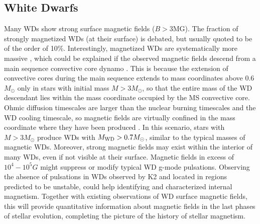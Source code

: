 {\color{red} \subsection{White Dwarfs}}
Many WDs show strong surface magnetic fields ($B>$3MG). The fraction of strongly magnetized WDs (at their surface) is debated, but usually quoted to be of the order of 10\%. Interestingly, magnetized WDs are systematically more massive \cite{Ferrario_2015}, which could be explained if the observed magnetic fields descend from a main sequence convective core dynamo \cite{Cantiello_2016}. This is because the extension of convective cores during the main sequence extends to mass coordinates above 0.6$M_\odot$ only in stars with initial mass $M>3M_\odot$, so that the entire mass of the WD descendant lies within the mass coordinate occupied by the MS convective core. Ohmic diffusion timescales are larger than the nuclear burning timescales and the WD cooling timescale, so magnetic fields are virtually confined in the mass coordinate where they have been produced \cite{Cantiello_2016}. In this scenario, stars with $M>3M_\odot$ produce WDs with $M_{\rm WD}>0.7M_\odot$, similar to the typical masses of magnetic WDs. Moreover, strong magnetic fields may exist within the interior of many WDs, even if not visible at their surface. Magnetic fields in excess of $10^4-10^5 G$ might suppress or modify typical WD g-mode pulsations. Observing the absence of pulsations in WDs observed by K2 and  located in regions predicted to be unstable, could help identifying and characterized internal magnetism. Together with existing observations of WD surface magnetic fields, this will provide quantitative information about magnetic fields in the last phases of stellar evolution,  completing the picture of the history of stellar magnetism.


